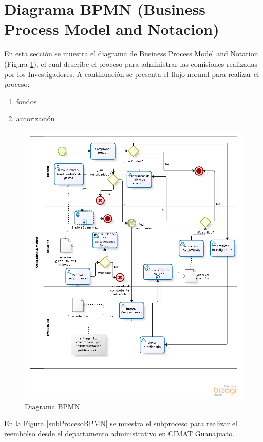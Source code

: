 \documentclass{report}
\begin{document}
    \section{Diagrama BPMN (Business Process Model and Notacion)}
    En esta sección se muestra el diagrama de Business Process Model and Notation (Figura \ref{BPMN}), el cual describe el proceso para administrar las comisiones realizadas por los Investigadores.
    A continuación se presenta el flujo normal para realizar el proceso:
    \begin{enumerate}
        \item fondos
        \item autorización
    \end{enumerate}
    	\begin{figure}[H]
    		\centering
    		    \label{BPMN}
    			\includegraphics[scale=0.70]{images/1models/comision.png}  
    			\caption{Diagrama BPMN}  		
    	\end{figure}
    En la Figura \ref{subProcesoBPMN} se muestra el subproceso para realizar el reembolso desde el departamento administrativo en CIMAT Guanajuato.
\end{document}
